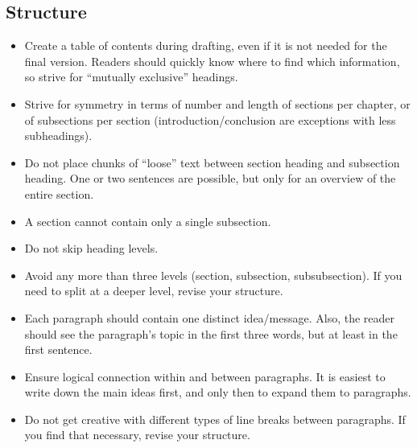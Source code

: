 \subsection{Structure}
\begin{itemize}
\item  Create a table of contents during drafting, even if it is not needed for the final version. %
Readers should quickly know where to find which information, so strive for ``mutually exclusive'' headings.

\item  Strive for symmetry in terms of number and length of sections per chapter, or of subsections per section (introduction/conclusion are exceptions with less subheadings). 

\item  Do not place chunks of ``loose'' text between section heading and subsection heading. One or two sentences are possible, but only for an overview of the entire section.

\item  A section cannot contain only a single subsection.

\item Do not skip heading levels.

\item  Avoid any more than three levels (section, subsection, subsubsection). If you need to split at a deeper level, revise your structure.

\item  Each paragraph should contain one distinct idea/message. Also, the reader should see the paragraph's topic in the first three words, but at least in the first sentence.

\item  Ensure logical connection within and between paragraphs. It is easiest to write down the main ideas first, and only then to expand them to paragraphs.

\item  Do not get creative with different types of line breaks between paragraphs. If you find that necessary, revise your structure.

\end{itemize}

